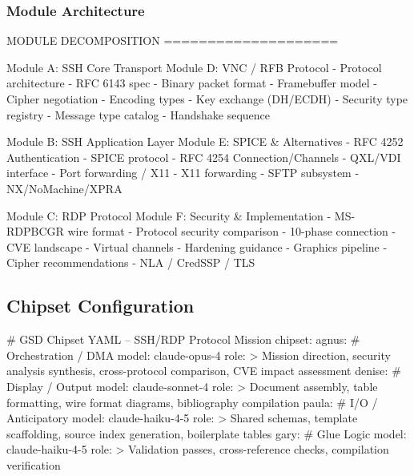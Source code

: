 \documentclass[11pt,letterpaper]{article}
\begin{document}
\subsubsection{Module Architecture}

\begin{asciibox}
MODULE DECOMPOSITION
====================

Module A: SSH Core Transport       Module D: VNC / RFB Protocol
  - Protocol architecture            - RFC 6143 spec
  - Binary packet format             - Framebuffer model
  - Cipher negotiation               - Encoding types
  - Key exchange (DH/ECDH)           - Security type registry
  - Message type catalog             - Handshake sequence

Module B: SSH Application Layer    Module E: SPICE & Alternatives
  - RFC 4252 Authentication          - SPICE protocol
  - RFC 4254 Connection/Channels     - QXL/VDI interface
  - Port forwarding / X11            - X11 forwarding
  - SFTP subsystem                   - NX/NoMachine/XPRA

Module C: RDP Protocol             Module F: Security & Implementation
  - MS-RDPBCGR wire format           - Protocol security comparison
  - 10-phase connection              - CVE landscape
  - Virtual channels                 - Hardening guidance
  - Graphics pipeline                - Cipher recommendations
  - NLA / CredSSP / TLS
\end{asciibox}

\subsection{Chipset Configuration}

\begin{asciibox}
# GSD Chipset YAML -- SSH/RDP Protocol Mission
chipset:
  agnus:                         # Orchestration / DMA
    model: claude-opus-4
    role: >
      Mission direction, security analysis synthesis,
      cross-protocol comparison, CVE impact assessment
  denise:                        # Display / Output
    model: claude-sonnet-4
    role: >
      Document assembly, table formatting, wire format
      diagrams, bibliography compilation
  paula:                         # I/O / Anticipatory
    model: claude-haiku-4-5
    role: >
      Shared schemas, template scaffolding, source
      index generation, boilerplate tables
  gary:                          # Glue Logic
    model: claude-haiku-4-5
    role: >
      Validation passes, cross-reference checks,
      compilation verification
\end{asciibox}
\end{document}

